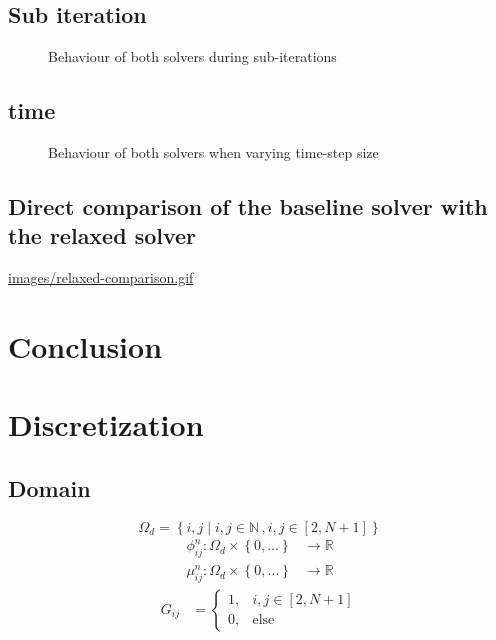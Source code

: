 \documentclass[11pt]{article}
\begin{document}
\subsection*{Sub iteration}
\label{sec:org4c9f08c}
\begin{figure}[htbp]
\centering

\caption{\label{fig:relaxed-convergence}Behaviour of both solvers during sub-iterations}
\end{figure}
\subsection*{time}
\label{sec:orgec8065c}
\begin{figure}[htbp]
\centering

\caption{\label{fig:relaxed-stability-in-time}Behaviour of both solvers when varying time-step size}
\end{figure}
\subsection*{Direct comparison of the baseline solver with the relaxed solver}
\label{sec:org691f07d}

\url{images/relaxed-comparison.gif}
\section*{Conclusion}
\label{sec:org2131dd5}
\section*{Discretization}
\label{sec:orgfea45b0}
\subsection*{Domain}
\label{sec:org5ab43b0}
\begin{equation}
\Omega_d = \left\{ i,j \mid i,j \in \mathbb{N} \,, i,j \in [2,N+1] \right\}
\end{equation}
\begin{equation}
\begin{aligned}
\phi_{ij}^n: \Omega_d \times \left\{ 0, \dots  \right\} &\to \mathbb{R}\\
\mu_{ij}^n: \Omega_d \times \left\{ 0, \dots \right\} &\to \mathbb{R}
\end{aligned}
\end{equation}
\begin{align*}
G_{ij} &=
\begin{cases}
1, & i,j \in [2,N+1]  \\
0, & \text{else}
\end{cases}
\end{align*}
\end{document}

